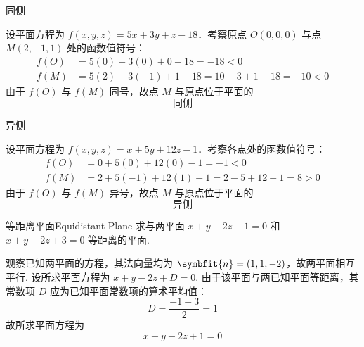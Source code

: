 \begin{solution}
     同侧

    设平面方程为 $f(x, y, z) = 5x + 3y + z - 18$．考察原点 $O(0, 0, 0)$ 与点 $M(2, -1, 1)$ 处的函数值符号：
    \begin{equation}
        \begin{aligned}
            f(O) & = 5(0) + 3(0) + 0 - 18 = -18 < 0                    \\
            f(M) & = 5(2) + 3(-1) + 1 - 18 = 10 - 3 + 1 - 18 = -10 < 0
        \end{aligned}
    \end{equation}
    由于 $f(O)$ 与 $f(M)$ 同号，故点 $M$ 与原点位于平面的
    \begin{equation}
        \boxed{\text{同侧}}
    \end{equation}

     异侧

    设平面方程为 $f(x, y, z) = x + 5y + 12z - 1$．考察各点处的函数值符号：
    \begin{equation}
        \begin{aligned}
            f(O) & = 0 + 5(0) + 12(0) - 1 = -1 < 0                  \\
            f(M) & = 2 + 5(-1) + 12(1) - 1 = 2 - 5 + 12 - 1 = 8 > 0
        \end{aligned}
    \end{equation}
    由于 $f(O)$ 与 $f(M)$ 异号，故点 $M$ 与原点位于平面的
    \begin{equation}
        \boxed{\text{异侧}}
    \end{equation}
\end{solution}


\begin{problem}{等距离平面}{Equidistant-Plane}
    求与两平面 $x + y - 2z - 1 = 0$ 和 $x + y - 2z + 3 = 0$ 等距离的平面.
\end{problem}

\begin{solution}
    观察已知两平面的方程，其法向量均为 $\symbfit{n} = (1, 1, -2)$，故两平面相互平行.
    设所求平面方程为 $x + y - 2z + D = 0$.
    由于该平面与两已知平面等距离，其常数项 $D$ 应为已知平面常数项的算术平均值：
    \begin{equation}
        D = \frac{-1 + 3}{2} = 1
    \end{equation}
    故所求平面方程为
    \begin{equation}
        \boxed{x + y - 2z + 1 = 0}
    \end{equation}
\end{solution}

